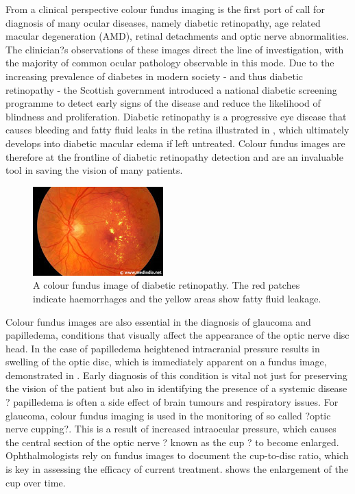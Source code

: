 From a clinical perspective colour fundus imaging is the first port of call
for diagnosis of many ocular diseases, namely diabetic retinopathy, age
related macular degeneration (AMD), retinal detachments and optic nerve abnormalities.\cite{3_medicine.uiowa.edu_2015} The clinician?s
observations of these images direct the line of investigation, with the
majority of common ocular pathology observable in this mode. Due to
the increasing prevalence of diabetes in modern society - and thus
diabetic retinopathy - the Scottish government introduced a national diabetic screening programme to detect early signs of the disease and reduce the
likelihood of blindness and proliferation. Diabetic retinopathy is a progressive
eye disease that causes bleeding and fatty fluid leaks in the retina illustrated
in , which ultimately develops into diabetic macular edema if
left untreated. Colour fundus images are therefore at the frontline of
diabetic retinopathy detection and are an invaluable tool in saving the vision
of many patients.

\begin{figure}[H]
\centering
\includegraphics{figures/diabeticretinopathy}
\caption{A colour fundus image of diabetic retinopathy. The red patches indicate haemorrhages and the yellow areas show fatty fluid leakage.}
\label{fig:dr}
   \end{figure}

Colour fundus images are also essential in the diagnosis of glaucoma and
papilledema, conditions that visually affect the appearance of the optic
nerve disc head.  In the case of papilledema heightened intracranial pressure
results in swelling of the optic disc, which is immediately apparent on a
fundus image, demonstrated in . Early diagnosis of this condition
is vital not just for preserving the vision of the patient but also in identifying
the presence of a systemic disease ? papilledema is often a side effect of brain
tumours and respiratory issues. For glaucoma, colour fundus imaging is used in
the monitoring of so called ?optic nerve cupping?. This is a result of increased
intraocular pressure, which causes the central section of the optic nerve ? known
as the cup ? to become enlarged. Ophthalmologists rely on fundus images to document the cup-to-disc ratio, which is key in assessing the efficacy of
current treatment.
 shows the enlargement of the cup over time.

